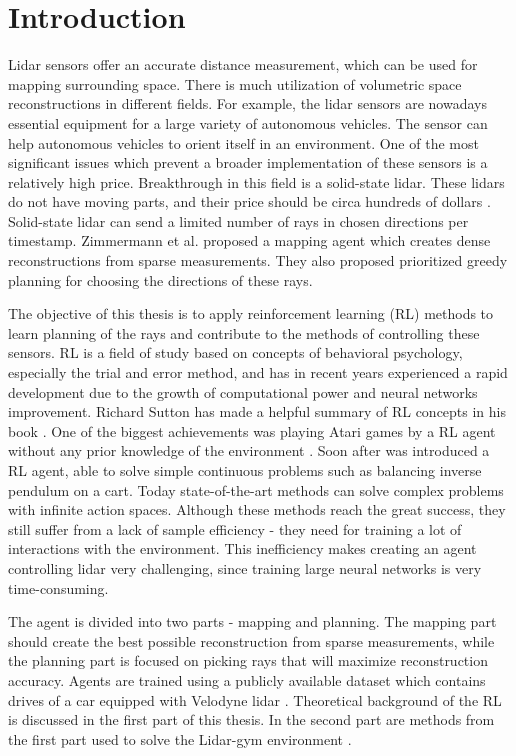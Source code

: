 \section{Introduction}

Lidar sensors offer an accurate distance measurement, which can be used for mapping surrounding space. There is much utilization of volumetric space reconstructions in different fields. For example, the lidar sensors are nowadays essential equipment for a large variety of autonomous vehicles. The sensor can help autonomous vehicles to orient itself in an environment. One of the most significant issues which prevent a broader implementation of these sensors is a relatively high price. Breakthrough in this field is a solid-state lidar. These lidars do not have moving parts, and their price should be circa hundreds of dollars \cite{quanergy2016}. Solid-state lidar can send a limited number of rays in chosen directions per timestamp. Zimmermann et al. \cite{zimmermann2017} proposed a mapping agent which creates dense reconstructions from sparse measurements. They also proposed prioritized greedy planning for choosing the directions of these rays. \par The objective of this thesis is to apply reinforcement learning (RL) methods to learn planning of the rays and contribute to the methods of controlling these sensors. RL is a field of study based on concepts of behavioral psychology, especially the trial and error method, and has in recent years experienced a rapid development due to the growth of computational power and neural networks improvement. Richard Sutton has made a helpful summary of RL concepts in his book \cite{sutton2012}. One of the biggest achievements was playing Atari games by a RL agent without any prior knowledge of the environment \cite{mnih2015}. Soon after was introduced a RL agent, able to solve simple continuous problems such as balancing inverse pendulum on a cart. Today state-of-the-art methods can solve complex problems with infinite action spaces. Although these methods reach the great success, they still suffer from a lack of sample efficiency - they need for training a lot of interactions with the environment. This inefficiency makes creating an agent controlling lidar very challenging, since training large neural networks is very time-consuming. \par The agent is divided into two parts - mapping and planning. The mapping part should create the best possible reconstruction from sparse measurements, while the planning part is focused on picking rays that will maximize reconstruction accuracy. Agents are trained using a publicly available dataset which contains drives of a car equipped with Velodyne lidar \cite{geiger2013}. Theoretical background of the RL is discussed in the first part of this thesis. In the second part are methods from the first part used to solve the Lidar-gym environment \cite{rozsypalek2018}.
  